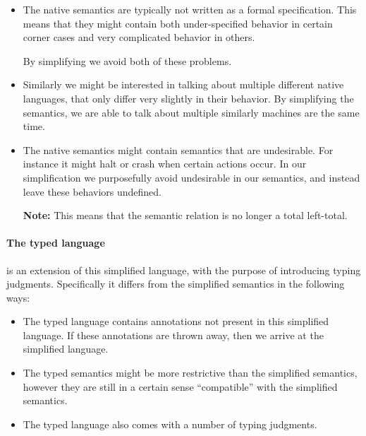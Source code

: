 \begin{itemize}
\item The native semantics are typically not written as a formal
  specification. This means that they might contain both under-specified
  behavior in certain corner cases and very complicated behavior in others.

  By simplifying we avoid both of these problems.
\item Similarly we might be interested in talking about multiple different
  native languages, that only differ very slightly in their behavior. By
  simplifying the semantics, we are able to talk about multiple similarly
  machines are the same time.
\item The native semantics might contain semantics that are undesirable. For
  instance it might halt or crash when certain actions occur. In our
  simplification we purposefully avoid undesirable in our semantics, and instead
  leave these behaviors undefined.

  \textbf{Note:} This means that the semantic relation is no longer a total
  left-total.
\end{itemize}

\paragraph{The typed language} is an extension of this simplified language, with
the purpose of introducing typing judgments. Specifically it differs from the
simplified semantics in the following ways:

\begin{itemize}
\item The typed language contains annotations not present in this simplified
  language. If these annotations are thrown away, then we arrive at the
  simplified language.

\item The typed semantics might be more restrictive than the simplified
  semantics, however they are still in a certain sense ``compatible'' with the
  simplified semantics.

\item The typed language also comes with a number of typing judgments.
\end{itemize}
